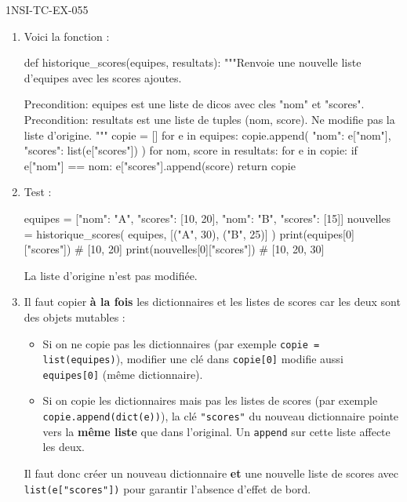 \begin{corrige}{1NSI-TC-EX-055}
\begin{enumerate}
  \item Voici la fonction :
\begin{python}
def historique_scores(equipes, resultats):
    """Renvoie une nouvelle liste d'equipes avec les
    scores ajoutes.

    Precondition: equipes est une liste de dicos avec
    cles "nom" et "scores".
    Precondition: resultats est une liste de tuples
    (nom, score).
    Ne modifie pas la liste d'origine.
    """
    copie = []
    for e in equipes:
        copie.append({
            "nom": e["nom"],
            "scores": list(e["scores"])
        })
    for nom, score in resultats:
        for e in copie:
            if e["nom"] == nom:
                e["scores"].append(score)
    return copie
\end{python}

  \item Test :
\begin{python}
equipes = [{"nom": "A", "scores": [10, 20]},
            {"nom": "B", "scores": [15]}]
nouvelles = historique_scores(
    equipes, [("A", 30), ("B", 25)]
)
print(equipes[0]["scores"])   # [10, 20]
print(nouvelles[0]["scores"]) # [10, 20, 30]
\end{python}
La liste d'origine n'est pas modifiée.

  \item Il faut copier \textbf{à la fois} les dictionnaires et les listes de scores car les deux sont des objets mutables :
  \begin{itemize}
    \item Si on ne copie pas les dictionnaires (par exemple \lstinline{copie = list(equipes)}), modifier une clé dans \lstinline{copie[0]} modifie aussi \lstinline{equipes[0]} (même dictionnaire).
    \item Si on copie les dictionnaires mais pas les listes de scores (par exemple \lstinline{copie.append(dict(e))}), la clé \lstinline{"scores"} du nouveau dictionnaire pointe vers la \textbf{même liste} que dans l'original. Un \lstinline{append} sur cette liste affecte les deux.
  \end{itemize}
  Il faut donc créer un nouveau dictionnaire \textbf{et} une nouvelle liste de scores avec \lstinline{list(e["scores"])} pour garantir l'absence d'effet de bord.
\end{enumerate}
\end{corrige}
